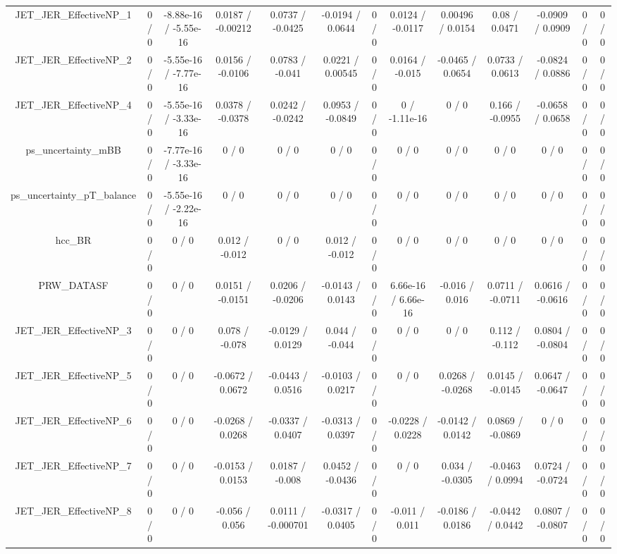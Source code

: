 \documentclass[10pt]{article}
\begin{document}
\begin{table}[htbp]
\begin{center}
\begin{tabular}{|c|c|c|c|c|c|c|c|c|c|c|c|c|}
  JET_JER_EffectiveNP_1 & 0 / 0 & -8.88e-16 / -5.55e-16 & 0.0187 / -0.00212 & 0.0737 / -0.0425 & -0.0194 / 0.0644 & 0 / 0 & 0.0124 / -0.0117 & 0.00496 / 0.0154 & 0.08 / 0.0471 & -0.0909 / 0.0909 & 0 / 0 & 0 / 0 \\ 
  JET_JER_EffectiveNP_2 & 0 / 0 & -5.55e-16 / -7.77e-16 & 0.0156 / -0.0106 & 0.0783 / -0.041 & 0.0221 / 0.00545 & 0 / 0 & 0.0164 / -0.015 & -0.0465 / 0.0654 & 0.0733 / 0.0613 & -0.0824 / 0.0886 & 0 / 0 & 0 / 0 \\ 
  JET_JER_EffectiveNP_4 & 0 / 0 & -5.55e-16 / -3.33e-16 & 0.0378 / -0.0378 & 0.0242 / -0.0242 & 0.0953 / -0.0849 & 0 / 0 & 0 / -1.11e-16 & 0 / 0 & 0.166 / -0.0955 & -0.0658 / 0.0658 & 0 / 0 & 0 / 0 \\ 
  ps_uncertainty_mBB & 0 / 0 & -7.77e-16 / -3.33e-16 & 0 / 0 & 0 / 0 & 0 / 0 & 0 / 0 & 0 / 0 & 0 / 0 & 0 / 0 & 0 / 0 & 0 / 0 & 0 / 0 \\ 
  ps_uncertainty_pT_balance & 0 / 0 & -5.55e-16 / -2.22e-16 & 0 / 0 & 0 / 0 & 0 / 0 & 0 / 0 & 0 / 0 & 0 / 0 & 0 / 0 & 0 / 0 & 0 / 0 & 0 / 0 \\ 
  hcc_BR & 0 / 0 & 0 / 0 & 0.012 / -0.012 & 0 / 0 & 0.012 / -0.012 & 0 / 0 & 0 / 0 & 0 / 0 & 0 / 0 & 0 / 0 & 0 / 0 & 0 / 0 \\ 
  PRW_DATASF & 0 / 0 & 0 / 0 & 0.0151 / -0.0151 & 0.0206 / -0.0206 & -0.0143 / 0.0143 & 0 / 0 & 6.66e-16 / 6.66e-16 & -0.016 / 0.016 & 0.0711 / -0.0711 & 0.0616 / -0.0616 & 0 / 0 & 0 / 0 \\ 
  JET_JER_EffectiveNP_3 & 0 / 0 & 0 / 0 & 0.078 / -0.078 & -0.0129 / 0.0129 & 0.044 / -0.044 & 0 / 0 & 0 / 0 & 0 / 0 & 0.112 / -0.112 & 0.0804 / -0.0804 & 0 / 0 & 0 / 0 \\ 
  JET_JER_EffectiveNP_5 & 0 / 0 & 0 / 0 & -0.0672 / 0.0672 & -0.0443 / 0.0516 & -0.0103 / 0.0217 & 0 / 0 & 0 / 0 & 0.0268 / -0.0268 & 0.0145 / -0.0145 & 0.0647 / -0.0647 & 0 / 0 & 0 / 0 \\ 
  JET_JER_EffectiveNP_6 & 0 / 0 & 0 / 0 & -0.0268 / 0.0268 & -0.0337 / 0.0407 & -0.0313 / 0.0397 & 0 / 0 & -0.0228 / 0.0228 & -0.0142 / 0.0142 & 0.0869 / -0.0869 & 0 / 0 & 0 / 0 & 0 / 0 \\ 
  JET_JER_EffectiveNP_7 & 0 / 0 & 0 / 0 & -0.0153 / 0.0153 & 0.0187 / -0.008 & 0.0452 / -0.0436 & 0 / 0 & 0 / 0 & 0.034 / -0.0305 & -0.0463 / 0.0994 & 0.0724 / -0.0724 & 0 / 0 & 0 / 0 \\ 
  JET_JER_EffectiveNP_8 & 0 / 0 & 0 / 0 & -0.056 / 0.056 & 0.0111 / -0.000701 & -0.0317 / 0.0405 & 0 / 0 & -0.011 / 0.011 & -0.0186 / 0.0186 & -0.0442 / 0.0442 & 0.0807 / -0.0807 & 0 / 0 & 0 / 0 \\ 

\end{tabular}
\end{center}
\end{table}
\end{document}
